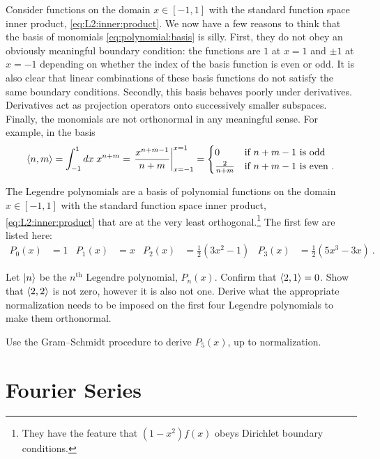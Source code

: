 Consider functions on the domain $x\in[-1,1]$ with the standard function space inner product, \eqref{eq:L2:inner:product}. We now have a few reasons to think that the basis of monomials \eqref{eq:polynomial:basis} is silly. First, they do not obey an obviously meaningful boundary condition: the functions are $1$ at $x=1$  and $\pm 1$ at $x=-1$ depending on whether the index of the basis function is even or odd. It is also clear that linear combinations of these basis functions do not satisfy the same boundary conditions. Secondly, this basis behaves poorly under derivatives. Derivatives act as projection operators onto successively smaller subspaces. Finally, the monomials are not orthonormal in any meaningful sense. For example,  in the basis
\begin{align}
    \langle n, m \rangle  = \int_{-1}^1 dx\; x^{n+m} = \left.\frac{x^{n+m-1}}{n+m}\right|^{x=1}_{x=-1}
    =
    \begin{cases}
    0 & \textnormal{if } n+m-1 \textnormal { is odd}
    \\
    \frac{2}{n+m} & \textnormal{if } n+m-1 \textnormal { is even} \ .
    \end{cases}
\end{align}

The Legendre polynomials are a basis of polynomial functions on the domain $x\in[-1,1]$ with the standard function space inner product, \eqref{eq:L2:inner:product} that are at the very least orthogonal.\footnote{They have the feature that $(1-x^2)f(x)$ obeys Dirichlet boundary conditions.} The first few are listed here:
\begin{align}
    P_0(x) &= 1
    &
    P_1(x) &= x
    &
    P_2(x) &= \frac{1}{2}(3x^2-1)
    &
    P_3(x) &= \frac{1}{2}(5x^3-3x) \ .
\end{align}
\begin{exercise}
Let $\left|n\right\rangle$ be the $n^\text{th}$ Legendre polynomial, $P_n(x)$.
Confirm that $\langle 2, 1 \rangle = 0$. Show that $\langle 2, 2 \rangle$ is not zero, however it is also not one. Derive what the appropriate normalization needs to be imposed on the first four Legendre polynomials to make them orthonormal. 
\end{exercise}
\begin{exercise}
Use the Gram--Schmidt procedure to derive $P_5(x)$, up to normalization. 
\end{exercise}




\section{Fourier Series}

